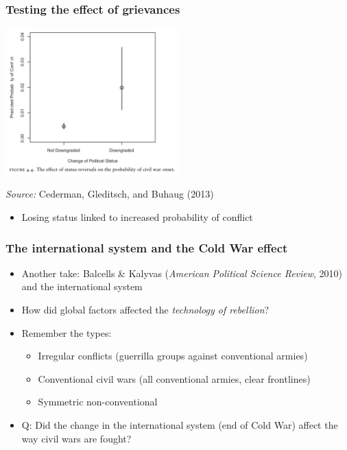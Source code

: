\documentclass[aspectratio=43]{beamer}
\begin{document}
\begin{frame}
\frametitle{Testing the effect of grievances}
\centering

\includegraphics[width = 0.5\textwidth]{img/cgb_effect_downgrading}

\vspace{10pt}

{\small \textit{Source:} Cederman, Gleditsch, and Buhaug (2013)}

\vspace{15pt}

\begin{itemize}
  \item Losing status linked to increased probability of conflict
\end{itemize}

\end{frame}

\begin{frame}
\frametitle{The international system and the Cold War effect}
\centering

\begin{itemize}
  \item Another take: Balcells \& Kalyvas (\textit{American Political Science Review}, 2010) and the international system
  \item How did global factors affected the \textit{technology of rebellion}?
  \item Remember the types:
  \begin{itemize}
    \item Irregular conflicts (guerrilla groups against conventional armies)
    \item Conventional civil wars (all conventional armies, clear frontlines)
    \item Symmetric non-conventional
  \end{itemize}
  \item Q: Did the change in the international system (end of Cold War) affect the way civil wars are fought?
\end{itemize}

\end{frame}
\end{document}
